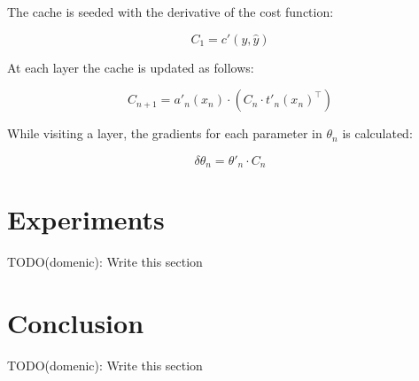 \documentclass{article}
\begin{document}
The cache is seeded with the derivative of the cost function: 

\begin{equation}
C_1 = c'(y, \hat{y})
\end{equation}

At each layer the cache is updated as follows:

\begin{equation}
C_{n+1} = a'_n(x_n) \cdot (C_n \cdot t'_n(x_n)^\top)
\end{equation}

While visiting a layer, the gradients for each parameter in $\theta_n$ is calculated:

\begin{equation}
\delta\theta_n = \theta'_n \cdot C_n
\end{equation}

\section{Experiments}

TODO(domenic): Write this section

\section{Conclusion}

TODO(domenic): Write this section
\end{document}
